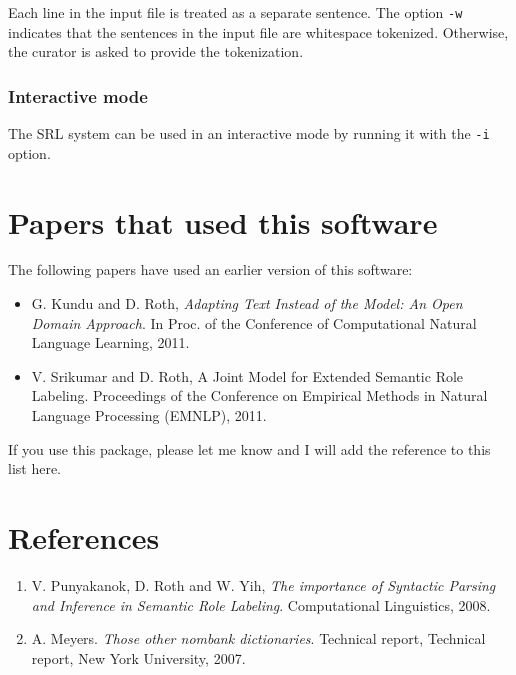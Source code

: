 \documentclass[11pt]{article}
\begin{document}
   Each line in the input file is treated as a separate sentence. The
   option \texttt{-w} indicates that the sentences in the input file are
   whitespace tokenized. Otherwise, the curator is asked to provide
   the tokenization.
\subsubsection{Interactive mode}
\label{sec-2_3_3}

   The SRL system can be used in an interactive mode by running it
   with the \texttt{-i} option.
   
\section{Papers that used this software}
\label{sec-3}

  The following papers have used an earlier version of this software:
  
\begin{itemize}
\item G. Kundu and D. Roth, \emph{Adapting Text Instead of the Model: An Open     Domain Approach}. In Proc. of the Conference of Computational
    Natural Language Learning, 2011.
\item V. Srikumar and D. Roth, A Joint Model for Extended Semantic Role
    Labeling. Proceedings of the Conference on Empirical Methods in
    Natural Language Processing (EMNLP), 2011.
\end{itemize}

  If you use this package, please let me know and I will add the
  reference to this list here.
  
  
\section{References}
\label{sec-4}


\begin{enumerate}
\item V. Punyakanok, D. Roth and W. Yih, \emph{The importance of Syntactic      Parsing and Inference in Semantic Role Labeling}. Computational
     Linguistics, 2008.
\item A. Meyers. \emph{Those other nombank dictionaries}. Technical report,
     Technical report, New York University, 2007.
\end{enumerate}
  
\end{document}
